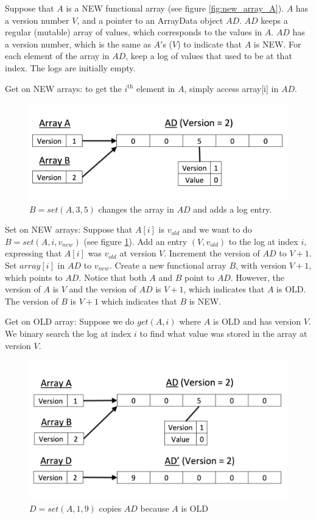 \documentclass[preprint]{sigplanconf}
\begin{document}
Suppose that $A$ is a NEW functional array  (see figure \ref{fig:new_array_A}). $A$ has a version number $V$, and a pointer to an ArrayData object $AD$. $AD$ keeps a regular (mutable) array of values, which corresponds to the values in $A$. $AD$ has a version number, which is the same as $A'$s ($V$) to indicate that $A$ is NEW. For each element of the array in $AD$, keep a log of values that used to be at that index. The logs are initially empty.

Get on NEW arrays: to get the $i^{\text{th}}$ element in $A$, simply access array[i] in $AD$.

\begin{figure}[!ht]
\centering
\includegraphics[scale=0.3]{set_A_return_B}
\nocaptionrule \caption{$B = set(A, 3, 5)$ changes the array in $AD$ and adds a log entry.}
\label{fig:set_A_return_B}
\end{figure}

Set on NEW arrays: Suppose that $A[i]$ is $v_{old}$ and we want to do $B = set(A, i, v_{new})$ (see figure \ref{fig:set_A_return_B}). Add an entry $(V, v_{old})$ to the log at index $i$, expressing that $A[i]$ was $v_{old}$ at version $V$. Increment the version of $AD$ to $V+1$. Set $array[i]$ in $AD$ to $v_{new}$. Create a new functional array $B$, with version $V+1$, which points to $AD$. Notice that both $A$ and $B$ point to $AD$. However, the version of $A$ is $V$ and the version of $AD$ is $V+1$, which indicates that $A$ is OLD. The version of $B$ is $V+1$ which indicates that $B$ is NEW.

Get on OLD array: Suppose we do $get(A, i)$ where $A$ is OLD and has version $V$. We binary search the log at index $i$ to find what value was stored in the array at version $V$.

\begin{figure}[!ht]
\centering
\includegraphics[scale=0.3]{set_old_array}
\nocaptionrule \caption{$D = set(A, 1, 9)$ copies $AD$ because $A$ is OLD}
\label{fig:set_old_array}
\end{figure}
\end{document}
